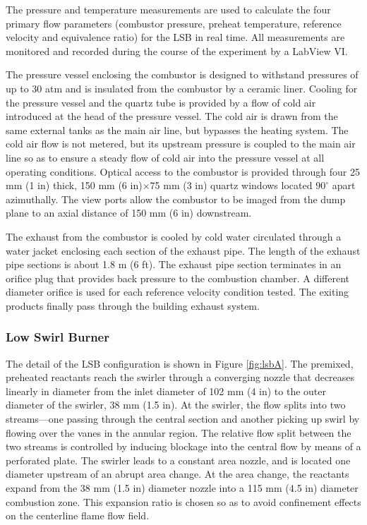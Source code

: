 The pressure and temperature measurements are used to calculate the four primary flow parameters (combustor pressure, preheat temperature, reference velocity and equivalence ratio) for the LSB in real time.
All measurements are monitored and recorded during the course of the experiment by a LabView VI.

The pressure vessel enclosing the combustor is designed to withstand pressures of up to 30 atm and is insulated from the combustor by a ceramic liner.
Cooling for the pressure vessel and the quartz tube is provided by a flow of cold air introduced at the head of the pressure vessel.
The cold air is drawn from the same external tanks as the main air line, but bypasses the heating system.
The cold air flow is not metered, but its upstream pressure is coupled to the main air line so as to ensure a steady flow of cold air into the pressure vessel at all operating conditions.
Optical access to the combustor is provided through four 25 mm (1 in) thick, 150 mm (6 in)\(\times\)75 mm (3 in) quartz windows located \(90^\circ\) apart azimuthally.
The view ports allow the combustor to be imaged from the dump plane to an axial distance of 150 mm (6 in) downstream.

The exhaust from the combustor is cooled by cold water circulated through a water jacket enclosing each section of the exhaust pipe.
The length of the exhaust pipe sections is about 1.8 m (6 ft).
The exhaust pipe section terminates in an orifice plug that provides back pressure to the combustion chamber.
A different diameter orifice is used for each reference velocity condition tested.
The exiting products finally pass through the building exhaust system.

\subsubsection{Low Swirl Burner}
\label{subsubsec:configuration-a-low-swirl-burner}



The detail of the LSB configuration is shown in Figure \ref{fig:lsbA}.
The premixed, preheated reactants reach the swirler through a converging nozzle that decreases linearly in diameter from the inlet diameter of 102 mm (4 in) to the outer diameter of the swirler, 38 mm (1.5 in).
At the swirler, the flow splits into two streams---one passing through the central section and another picking up swirl by flowing over the vanes in the annular region.
The relative flow split between the two streams is controlled by inducing blockage into the central flow by means of a perforated plate.
The swirler leads to a constant area nozzle, and is located one diameter upstream of an abrupt area change.
At the area change, the reactants expand from the 38 mm (1.5 in) diameter nozzle into a 115 mm (4.5 in) diameter combustion zone.
This expansion ratio is chosen so as to avoid confinement effects on the centerline flame flow field.\cite{1998-yegian}


